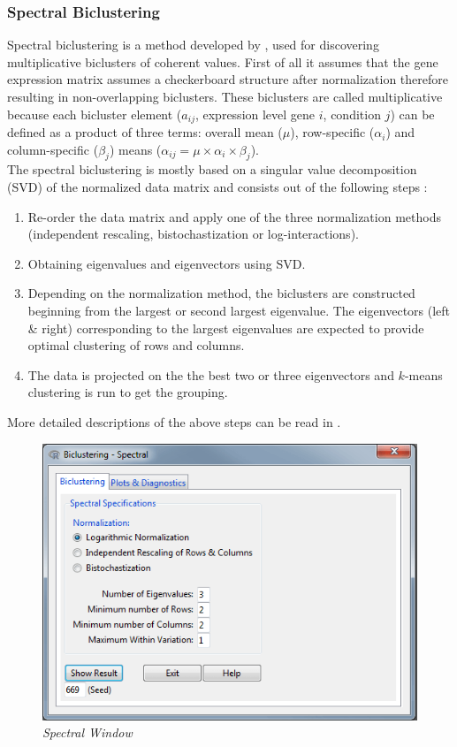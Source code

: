 \documentclass[a4paper]{article}\usepackage[]{graphicx}\usepackage[]{color}
\begin{document}
\subsubsection{Spectral Biclustering}
Spectral biclustering is a method developed by \citet{Kluger2003}, used
for discovering multiplicative biclusters of coherent values. First of all it
assumes that the gene expression matrix assumes a checkerboard structure after
normalization therefore resulting in non-overlapping biclusters. These
biclusters are called multiplicative because each bicluster element ($a_{ij}$, expression level
gene $i$, condition $j$) can be defined as a product of three terms: overall
mean ($\mu$), row-specific ($\alpha_i$) and column-specific ($\beta_j$) means
($\alpha_{ij}=\mu \times \alpha_i \times \beta_j$).\\
The spectral biclustering is mostly based on a singular value decomposition
(SVD) of the normalized data matrix and consists out of the following steps
\citet{Kaiser2008}:
\begin{enumerate}
  \item Re-order the data matrix and apply one of the three normalization
  methods (independent rescaling, bistochastization or log-interactions).
  \item Obtaining eigenvalues and eigenvectors using SVD.
  \item Depending on the normalization method, the biclusters are constructed
  beginning from the largest or second largest eigenvalue. The eigenvectors
  (left \& right) corresponding to the largest eigenvalues are expected to
  provide optimal clustering of rows and columns.
  \item The data is projected on the the best two or three eigenvectors and
  $k$-means clustering is run to get the grouping.
\end{enumerate}
\noindent More detailed descriptions of the above steps can be read in \citet{Kluger2003}.
\begin{figure}[H]
\centering
\includegraphics[scale=0.5]{figures/spectral_clusttab.png}
\caption{{\it Spectral Window}\label{spectral_clusttab}}
\end{figure}
\end{document}
